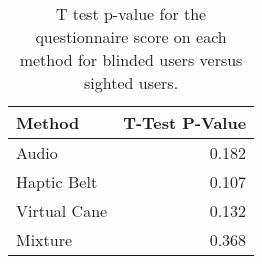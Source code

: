 
\begin{table}[!htb]
\centering
\caption{T test p-value for the questionnaire score on each method for blinded users versus sighted users.}
\label{tab:ttest_questionnaires}
\begin{tabular}{lr}
\toprule
      Method &  T-Test P-Value \\
\midrule
       Audio &           0.182 \\
 Haptic Belt &           0.107 \\
Virtual Cane &           0.132 \\
     Mixture &           0.368 \\
\bottomrule
\end{tabular}
\end{table}

